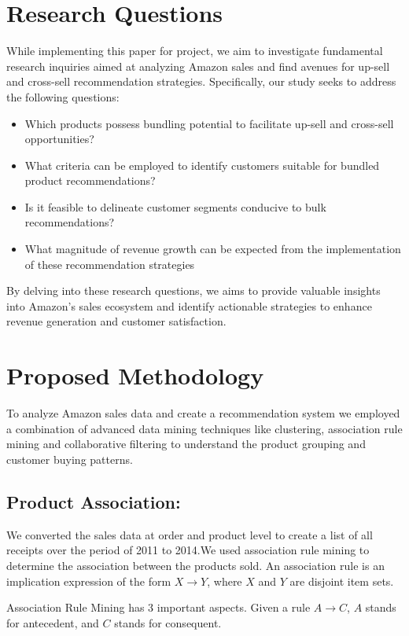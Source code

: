 \documentclass[11pt]{article} %
\begin{document}
\section{Research Questions}
While implementing this paper for project, we aim to investigate fundamental research inquiries aimed at analyzing Amazon sales and find avenues for up-sell and cross-sell recommendation strategies. Specifically, our study seeks to address the following questions: 
\begin{itemize}
    \item Which products possess bundling potential to facilitate up-sell and cross-sell opportunities?
    \item What criteria can be employed to identify customers suitable for bundled product recommendations?
    \item Is it feasible to delineate customer segments conducive to bulk recommendations?
    \item What magnitude of revenue growth can be expected from the implementation of these recommendation strategies
\end{itemize}
By delving into these research questions, we aims to provide valuable insights into Amazon's sales ecosystem and identify actionable strategies to enhance revenue generation and customer satisfaction.


\section{Proposed Methodology}

To analyze Amazon sales data and create a recommendation system we employed a combination of  advanced data mining techniques like clustering, association rule mining and collaborative filtering to understand the product grouping and customer buying patterns.

\subsection*{Product Association:}
We converted the sales data at order and product level to create a list of all receipts over the period of 2011 to 2014.We used association rule mining to determine the association between the products sold. An association rule is an implication expression of the form
$X \rightarrow Y$, where $X$ and $Y$ are disjoint item sets.

Association Rule Mining has 3 important aspects. Given a rule $A\rightarrow C$, $A$ stands for antecedent, and $C$ stands for consequent.
\end{document}
